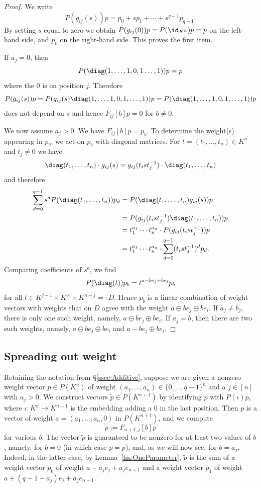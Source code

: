 \documentclass{amsart}
\newcommand{\omin}{\ominus}
\begin{document}
\begin{proof}
We write 
\[ P(g_{ij}(s))p=p_0 + sp_1 + \cdots + s^{q-1}p_{q-1}. \]
By setting $s$ equal to zero we obtain
$P(g_{ij}(0))p=P(\id_{K^n})p=p$ on the left-hand side, and
$p_0$ on the right-hand side. This proves the first item.

If $a_j=0$, then
\[ P(\diag(1,\ldots,1,0,1\ldots,1)) p = p \]
where the $0$ is on position $j$. Therefore
\[ P(g_{ij}(s)) p = P(g_{ij}(s)
\diag(1,\ldots,1,0,1,\ldots,1)) p =
P(\diag(1,\ldots,1,0,1,\ldots,1)) p \]
does not depend on $s$ and hence $F_{ij}[b] p =0$ for $b
\neq 0$. 

We now assume $a_j>0$. We have $F_{ij}[b] p=p_b$. To determine the
weight(s) appearing in $p_b$, we act on $p_b$ with diagonal matrices. For
$t=(t_1,\ldots,t_n) \in K^n$ and $t_j \neq 0$ we have
\[ 
\diag(t_1,\ldots,t_n) \cdot g_{ij}(s)
= g_{ij}(t_i s t_j^{-1}) \cdot \diag(t_1,\ldots,t_n) \]
and therefore 
\begin{align*} 
\sum_{d=0}^{q-1} s^d P(\diag(t_1,\ldots,t_n)) p_d 
&= P(\diag(t_1,\ldots,t_n) g_{ij}(s)) p \\
&= P(g_{ij}(t_ist_j^{-1}) \diag(t_1,\ldots,t_n)) p \\
&= t_1^{a_1} \cdots t_n^{a_n} \cdot P(g_{ij}(t_i s
t_j^{-1})) p \\
&= t_1^{a_1} \cdots t_n^{a_n} \cdot \sum_{d=0}^{q-1} (t_i s t_j^{-1})^d p_d. 
\end{align*}
Comparing coefficients of $s^b$, we find
\[ P(\diag(t))p_b=t^{a-be_j+be_i} p_b \]
for all $t \in K^{j-1} \times K^\times \times K^{n-j}=:D$. Hence
$p_b$ is a linear combination of weight vectors with weights
that on $D$ agree with the weight $a \omin b e_j \oplus b
e_i$. If $a_j \neq b_j$,
there is only one such weight, namely, $a \omin b e_j \oplus
b e_i$. If $a_j=b$, then there are two such weights, namely,
$a \omin b e_j \oplus b e_i$ and $a - be_j \oplus b e_i$. 
\end{proof}

\subsection{Spreading out weight}

Retaining the notation from \S\ref{ssec:Additive}, 
suppose we are given a nonzero weight vector $p \in P(K^n)$ of weight
$(a_1,\ldots,a_n) \in \{0,\ldots,q-1\}^n$ and a $j \in [n]$ with $a_j >
0$. We construct vectors $\tilde{p} \in P(K^{n+1})$ by identifying
$p$ with $P(\iota)p$, where $\iota:K^n \to K^{n+1}$ is the embedding
adding a $0$ in the last position.  Then $p$ is a vector of weight
$a=(a_1,\ldots,a_n,0)$ in $P(K^{n+1})$, and we compute
\[ \tilde{p}:=F_{n+1,j}[b] p \]
for various $b$. The vector $\tilde{p}$ is guaranteed to be nonzero for
at least two values of $b$, namely, for $b=0$ (in which case
$\tilde{p}=p$), and, as we will now see, for $b=a_j$.
Indeed, in the latter case, by Lemma~\ref{lm:OneParameter}, 
$\tilde{p}$ is the sum of a weight vector $\tilde{p}_0$ of weight $a-a_j
e_j + a_j e_{n+1}$ and a weight vector $\tilde{p}_1$ of
weight $a + (q-1-a_j) e_j + a_j e_{n+1}$.
\end{document}
